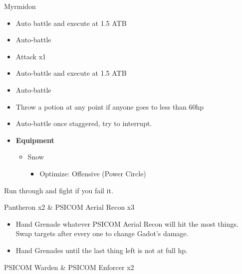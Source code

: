\begin{multicols}{2}

\begin{battle}{Myrmidon}
\begin{itemize}
    \item Auto battle and execute at 1.5 ATB
    \item Auto-battle
    \item Attack x1
    \item Auto-battle and execute at 1.5 ATB
    \item Auto-battle
    \item Throw a potion at any point if anyone goes to less than 60hp
    \item Auto-battle once staggered, try to interrupt.
\end{itemize}

\end{battle}


\begin{menu}
\begin{itemize}
    \item \textbf{Equipment}
    \begin{itemize}
        \item Snow
        \begin{itemize}
            \item Optimize: Offensive (Power Circle)
        \end{itemize}
    \end{itemize}
\end{itemize}
\end{menu}

Run through and fight if you fail it.

\begin{battle}{Pantheron x2 \& PSICOM Aerial Recon x3}
\begin{itemize}
    \item Hand Grenade whatever PSICOM Aerial Recon will hit the most things. Swap targets after every one to change Gadot's damage.
    \item Hand Grenades until the last thing left is not at full hp.
\end{itemize}

\end{battle}

\begin{battle}{PSICOM Warden \& PSICOM Enforcer x2}
\end{battle}

\end{multicols}